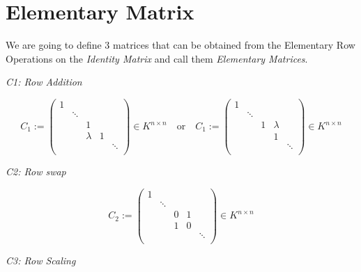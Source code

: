 \newpage
\section{Elementary Matrix}

We are going to define 3 matrices that can be obtained from the Elementary Row
Operations on the \emph{Identity Matrix} and call them \emph{Elementary Matrices}.

\emph{C1: Row Addition}

\[
       C_1 := 
       \begin{pmatrix}
       1      &        &        &        &        \\
              & \ddots &        &        &        \\
              &        & 1      &        &        \\
              &        & \lambda & 1     &        \\
              &        &        &        & \ddots \\
       \end{pmatrix}
       \in K^{n \times n}
       \quad \text{or} \quad
       C_1 := 
       \begin{pmatrix}
       1      &        &        &        &        \\
              & \ddots &        &        &        \\
              &        & 1      & \lambda &        \\
              &        &        & 1      &        \\
              &        &        &        & \ddots \\
       \end{pmatrix}
       \in K^{n \times n}
\]

\emph{C2: Row swap}

\[
       C_2 := 
       \begin{pmatrix}
       1      &        &        &        &        \\
              & \ddots &        &        &        \\
              &        & 0      & 1      &        \\
              &        & 1      & 0      &        \\
              &        &        &        & \ddots \\
       \end{pmatrix}
       \in K^{n \times n}
\]

\emph{C3: Row Scaling}

